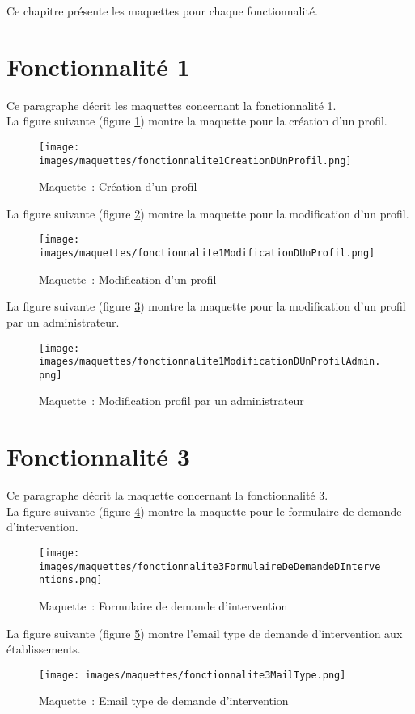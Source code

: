 Ce chapitre présente les maquettes pour chaque fonctionnalité.


\section{Fonctionnalité 1}
Ce paragraphe décrit les maquettes concernant la fonctionnalité 1. \\

La figure suivante (figure \ref{maquette1-1}) montre la maquette pour la création d'un profil.
\begin{figure}[H]
	\centering
	\texttt{[image: images/maquettes/fonctionnalite1CreationDUnProfil.png]}
	\caption{Maquette~: Création d'un profil }
	\label{maquette1-1}
\end{figure}

La figure suivante (figure \ref{maquette1-2}) montre la maquette pour la modification d'un profil.
\begin{figure}[H]
	\centering
	\texttt{[image: images/maquettes/fonctionnalite1ModificationDUnProfil.png]}
	\caption{Maquette~: Modification d'un profil}
	\label{maquette1-2}
\end{figure}

La figure suivante (figure \ref{maquette1-3}) montre la maquette pour la modification d'un profil par un administrateur.
\begin{figure}[H]
	\centering
	\texttt{[image: images/maquettes/fonctionnalite1ModificationDUnProfilAdmin.png]}
	\caption{Maquette~: Modification profil par un administrateur}
	\label{maquette1-3}
\end{figure}

\section{Fonctionnalité 3}
Ce paragraphe décrit la maquette concernant la fonctionnalité 3. \\

La figure suivante (figure \ref{maquette3-1}) montre la maquette pour le formulaire de demande d'intervention.
\begin{figure}[H]
	\centering
	\texttt{[image: images/maquettes/fonctionnalite3FormulaireDeDemandeDInterventions.png]}
	\caption{Maquette~: Formulaire de demande d'intervention}
	\label{maquette3-1}
\end{figure}

La figure suivante (figure \ref{maquette3-2}) montre l'email type de demande d'intervention aux établissements.
\begin{figure}[H]
	\centering
	\texttt{[image: images/maquettes/fonctionnalite3MailType.png]}
	\caption{Maquette~: Email type de demande d'intervention}
	\label{maquette3-2}
\end{figure}


